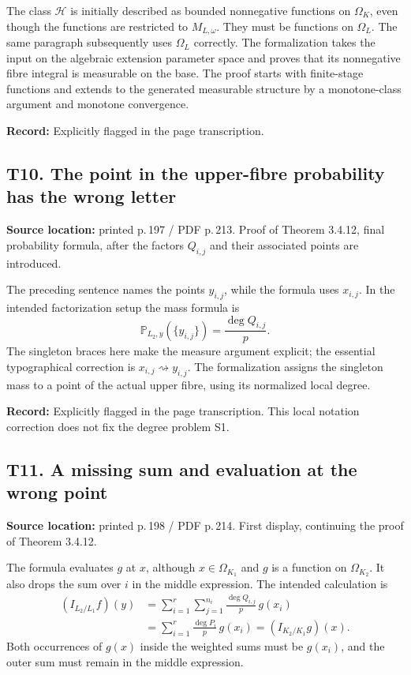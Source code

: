 \documentclass[10pt,a4paper]{article}
\newcommand{\loc}[2]{\textbf{Source location:} printed p.\,#1 / PDF p.\,#2.}
\newcommand{\hist}[1]{\par{\footnotesize\color{graytext}\textbf{Record:} #1}}
\newcommand{\PP}{\mathbb P}
\begin{document}
The class $\mathcal H$ is initially described as bounded nonnegative
functions on $\Omega_K$, even though the functions are restricted to
$M_{L,\omega}$. They must be functions on \textbf{$\Omega_L$}.
The same paragraph subsequently uses $\Omega_L$ correctly.
The formalization takes the input on the algebraic extension parameter space and
proves that its nonnegative fibre integral is measurable on the base.
The proof starts with finite-stage functions and extends to the
generated measurable structure by a monotone-class argument and
monotone convergence.
\hist{Explicitly flagged in the page transcription.}

\subsection{T10. The point in the upper-fibre probability has the wrong letter}
\loc{197}{213} Proof of Theorem 3.4.12, final probability formula,
after the factors $Q_{i,j}$ and their associated points are introduced.

The preceding sentence names the points $y_{i,j}$, while the formula
uses $x_{i,j}$. In the intended factorization setup the mass formula is
\[
 \PP_{L_2,y}(\{y_{i,j}\})=\frac{\deg Q_{i,j}}{p}.
\]
The singleton braces here make the measure argument explicit; the
essential typographical correction is $x_{i,j}\rightsquigarrow y_{i,j}$.
The formalization assigns the singleton mass to a point of the actual
upper fibre, using its normalized local degree.
\hist{Explicitly flagged in the page transcription. This local notation
correction does not fix the degree problem S1.}

\subsection{T11. A missing sum and evaluation at the wrong point}
\loc{198}{214} First display, continuing the proof of Theorem 3.4.12.

The formula evaluates $g$ at $x$, although $x\in\Omega_{K_1}$ and
$g$ is a function on $\Omega_{K_2}$. It also drops the sum over $i$
in the middle expression. The intended calculation is
\begin{align*}
 (I_{L_2/L_1}f)(y)
 &=\sum_{i=1}^{r}\sum_{j=1}^{n_i}\frac{\deg Q_{i,j}}{p}\,g(x_i)\\
 &=\sum_{i=1}^{r}\frac{\deg P_i}{p}\,g(x_i)
 =(I_{K_2/K_1}g)(x).
\end{align*}
Both occurrences of $g(x)$ inside the weighted sums must be $g(x_i)$,
and the outer sum must remain in the middle expression.
\end{document}

